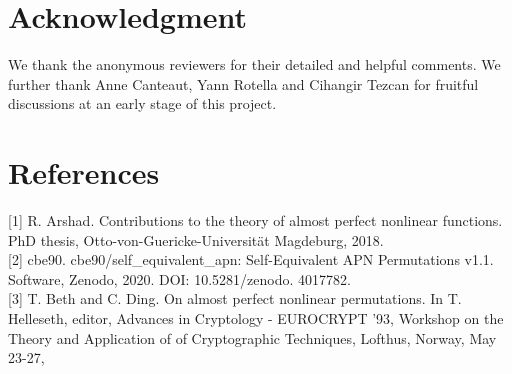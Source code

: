 \documentclass[10pt]{article}
\begin{document}
\section*{Acknowledgment}
We thank the anonymous reviewers for their detailed and helpful comments. We further thank Anne Canteaut, Yann Rotella and Cihangir Tezcan for fruitful discussions at an early stage of this project.

\section*{References}
[1] R. Arshad. Contributions to the theory of almost perfect nonlinear functions. PhD thesis, Otto-von-Guericke-Universität Magdeburg, 2018.\\[0pt]
[2] cbe90. cbe90/self\_equivalent\_apn: Self-Equivalent APN Permutations v1.1. Software, Zenodo, 2020. DOI: 10.5281/zenodo. 4017782.\\[0pt]
[3] T. Beth and C. Ding. On almost perfect nonlinear permutations. In T. Helleseth, editor, Advances in Cryptology - EUROCRYPT '93, Workshop on the Theory and Application of of Cryptographic Techniques, Lofthus, Norway, May 23-27,
\end{document}

